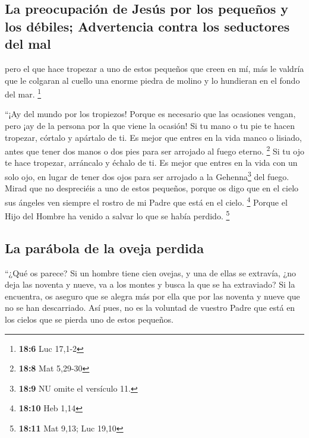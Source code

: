 \begin{paracol}{2}
\hypertarget{la-preocupaciuxf3n-de-jesuxfas-por-los-pequeuxf1os-y-los-duxe9biles-advertencia-contra-los-seductores-del-mal}{%
\subsection{La preocupación de Jesús por los pequeños y los débiles;
Advertencia contra los seductores del
mal}\label{la-preocupaciuxf3n-de-jesuxfas-por-los-pequeuxf1os-y-los-duxe9biles-advertencia-contra-los-seductores-del-mal}}

 pero el que hace tropezar a uno de estos pequeños que
creen en mí, más le valdría que le colgaran al cuello una enorme piedra
de molino y lo hundieran en el fondo del mar. \footnote{\textbf{18:6}
  Luc 17,1-2}

 ``¡Ay del mundo por los tropiezos! Porque es necesario
que las ocasiones vengan, pero ¡ay de la persona por la que viene la
ocasión!  Si tu mano o tu pie te hacen tropezar, córtalo y
apártalo de ti. Es mejor que entres en la vida manco o lisiado, antes
que tener dos manos o dos pies para ser arrojado al fuego eterno.
\footnote{\textbf{18:8} Mat 5,29-30}  Si tu ojo te hace
tropezar, arráncalo y échalo de ti. Es mejor que entres en la vida con
un solo ojo, en lugar de tener dos ojos para ser arrojado a la
Gehenna\footnote{\textbf{18:9} NU omite el versículo 11.} del fuego.
 Mirad que no despreciéis a uno de estos pequeños, porque
os digo que en el cielo sus ángeles ven siempre el rostro de mi Padre
que está en el cielo. \footnote{\textbf{18:10} Heb 1,14} 
Porque el Hijo del Hombre ha venido a salvar lo que se había perdido.
\footnote{\textbf{18:11} Mat 9,13; Luc 19,10}

\hypertarget{la-paruxe1bola-de-la-oveja-perdida}{%
\subsection{La parábola de la oveja
perdida}\label{la-paruxe1bola-de-la-oveja-perdida}}

 ``¿Qué os parece? Si un hombre tiene cien ovejas, y una
de ellas se extravía, ¿no deja las noventa y nueve, va a los montes y
busca la que se ha extraviado?  Si la encuentra, os
aseguro que se alegra más por ella que por las noventa y nueve que no se
han descarriado.  Así pues, no es la voluntad de vuestro
Padre que está en los cielos que se pierda uno de estos pequeños.


\end{paracol}
